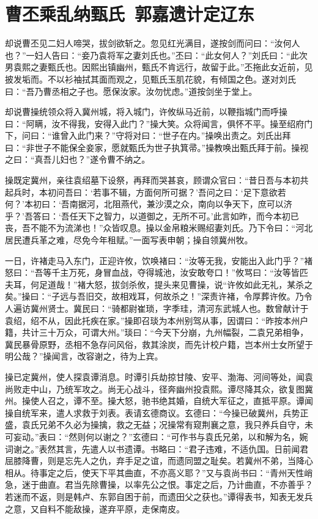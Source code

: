 \chapter{曹丕乘乱纳甄氏~郭嘉遗计定辽东}

却说曹丕见二妇人啼哭，拔剑欲斩之。忽见红光满目，遂按剑而问曰：“汝何人也？”一妇人告曰：“妾乃袁将军之妻刘氏也。”丕曰：“此女何人？”刘氏曰：“此次男袁熙之妻甄氏也。因熙出镇幽州，甄氏不肯远行，故留于此。”丕拖此女近前，见披发垢而。不以衫袖拭其面而观之，见甄氏玉肌花貌，有倾国之色。遂对刘氏曰：“吾乃曹丞相之子也。愿保汝家。汝勿忧虑。”道按剑坐于堂上。

却说曹操统领众将入冀州城，将入城门，许攸纵马近前，以鞭指城门而呼操曰：“阿瞒，汝不得我，安得入此门？”操大笑。众将闻言，俱怀不平。操至绍府门下，问曰：“谁曾入此门来？”守将对曰：“世子在内。”操唤出责之。刘氏出拜曰：“非世子不能保全妾家，愿就甄氏为世子执箕帚。”操教唤出甄氏拜于前。操视之曰：“真吾儿妇也？”遂令曹不纳之。

操既定冀州，亲往袁绍墓下设祭，再拜而哭甚哀，顾谓众官曰：“昔日吾与本初共起兵时，本初问吾曰：‘若事不辑，方面何所可据？’吾问之曰：‘足下意欲若何？’本初曰：‘吾南据河，北阻燕代，兼沙漠之众，南向以争天下，庶可以济乎？’吾答曰：‘吾任天下之智力，以道御之，无所不可。’此言如昨，而今本初已丧，吾不能不为流涕也！”众皆叹息。操以金帛粮米赐绍妻刘氏。乃下令曰：“河北居民遭兵革之难，尽免今年租赋。”一面写表申朝；操自领冀州牧。

一日，许褚走马入东门，正迎许攸，饮唤褚曰：“汝等无我，安能出入此门乎？”褚怒曰：“吾等千主万死，身冒血战，夺得城池，汝安敢夸口！”攸骂曰：“汝等皆匹夫耳，何足道哉！”褚大怒，拔剑杀攸，提头来见曹操，说“许攸如此无礼，某杀之矣。”操曰：“子远与吾旧交，故相戏耳，何故杀之！”深责许褚，令厚葬许攸。乃令人遍访冀州贤士。冀民曰：“骑都尉崔琐，字季珪，清河东武城人也。数曾献计于袁绍，绍不从，因此托疾在家。”操即召琰为本州别驾从事，因谓曰：“昨按本州户籍，共计三十万众，可谓大州。”琰曰：“今天下分崩，九州幅裂，二袁兄弟相争，冀民暴骨原野，丞相不急存问风俗，救其涂炭，而先计校户籍，岂本州士女所望于明公哉？”操闻言，改容谢之，待为上宾。

操已定冀州，使人探袁谭消息。时谭引兵劫掠甘陵、安平、渤海、河间等处，闻袁尚败走中山，乃统军攻之。尚无心战斗，径奔幽州投袁熙。谭尽降其众，欲复图冀州。操使人召之，谭不至。操大怒，驰书绝其婚，自统大军征之，直抵平原。谭闻操自统军来，遣人求救于刘表。表请玄德商议。玄德曰：“今操已破冀州，兵势正盛，袁氏兄弟不久必为操擒，救之无益；况操常有窥荆襄之意，我只养兵自守，未可妄动。”表曰：“然则何以谢之？”玄德曰：“可作书与袁氏兄弟，以和解为名，婉词谢之。”表然其言，先遣人以书遗谭。书略曰：“君子违难，不适仇国。日前闻君屈膝降曹，则是忘先人之仇，弃手足之谊，而遗同盟之耻矣。若冀州不弟，当降心相从。待事定之后，使天下平其曲直，不亦高义耶？”又与袁尚书曰：“青州天性峭急，迷于曲直。君当先除曹操，以率先公之恨。事定之后，乃计曲直，不亦善乎？若迷而不返，则是韩卢、东郭自困于前，而遗田父之获也。”谭得表书，知表无发兵之意，又自料不能敌操，遂弃平原，走保南皮。

